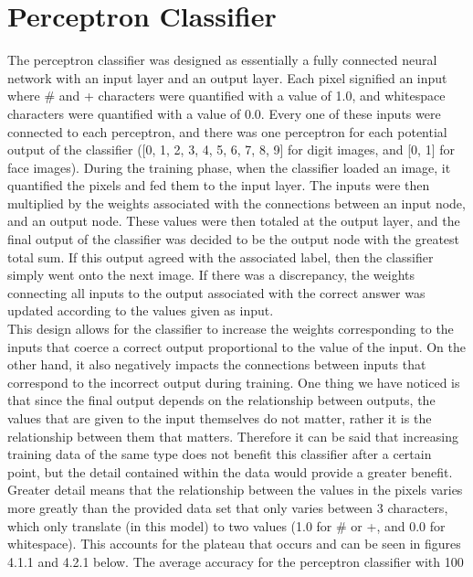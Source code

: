 \documentclass[12pt, letterpaper]{article}
\begin{document}
\section{Perceptron Classifier}
The perceptron classifier was designed as essentially a fully connected neural network with an input layer and an output layer. Each pixel signified an input where \# and + characters were quantified with a value of 1.0, and whitespace characters were quantified with a value of 0.0. Every one of these inputs were connected to each perceptron, and there was one perceptron for each potential output of the classifier ([0, 1, 2, 3, 4, 5, 6, 7, 8, 9] for digit images, and [0, 1] for face images). During the training phase, when the classifier loaded an image, it quantified the pixels and fed them to the input layer. The inputs were then multiplied by the weights associated with the connections between an input node, and an output node. These values were then totaled at the output layer, and the final output of the classifier was decided to be the output node with the greatest total sum. If this output agreed with the associated label, then the classifier simply went onto the next image. If there was a discrepancy, the weights connecting all inputs to the output associated with the correct answer was updated according to the values given as input. \\
This design allows for the classifier to increase the weights corresponding to the inputs that coerce a correct output proportional to the value of the input. On the other hand, it also negatively impacts the connections between inputs that correspond to the incorrect output during training. One thing we have noticed is that since the final output depends on the relationship between outputs, the values that are given to the input themselves do not matter, rather it is the relationship between them that matters. Therefore it can be said that increasing training data of the same type does not benefit this classifier after a certain point, but the detail contained within the data would provide a greater benefit. Greater detail means that the relationship between the values in the pixels varies more greatly than the provided data set that only varies between 3 characters, which only translate (in this model) to two values (1.0 for \# or +, and 0.0 for whitespace). This accounts for the plateau that occurs and can be seen in figures 4.1.1 and 4.2.1 below. The average accuracy for the perceptron classifier with 100%
\end{document}
